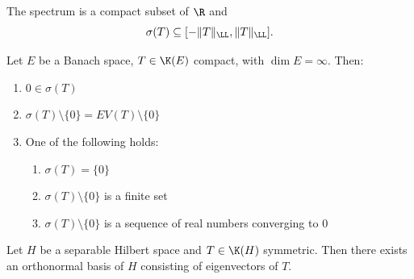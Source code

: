 \begin{remark}
The spectrum is a compact subset of $\R$ and
\[
\sigma(T) \subseteq [-\|T\|_\LL, \|T\|_\LL].
\]
\end{remark}

\begin{theorem}
Let $E$ be a Banach space, $T \in \K(E)$ compact, with $\dim E = \infty$. Then:
\begin{enumerate}
\item $0 \in \sigma(T)$
\item $\sigma(T) \setminus \{0\} = EV(T) \setminus \{0\}$
\item One of the following holds:
\begin{enumerate}
\item $\sigma(T) = \{0\}$
\item $\sigma(T) \setminus \{0\}$ is a finite set
\item $\sigma(T) \setminus \{0\}$ is a sequence of real numbers converging to $0$
\end{enumerate}
\end{enumerate}
\end{theorem}

\begin{theorem}
Let $H$ be a separable Hilbert space and $T \in \K(H)$ symmetric. Then there exists an orthonormal basis of $H$ consisting of eigenvectors of $T$.
\end{theorem}
